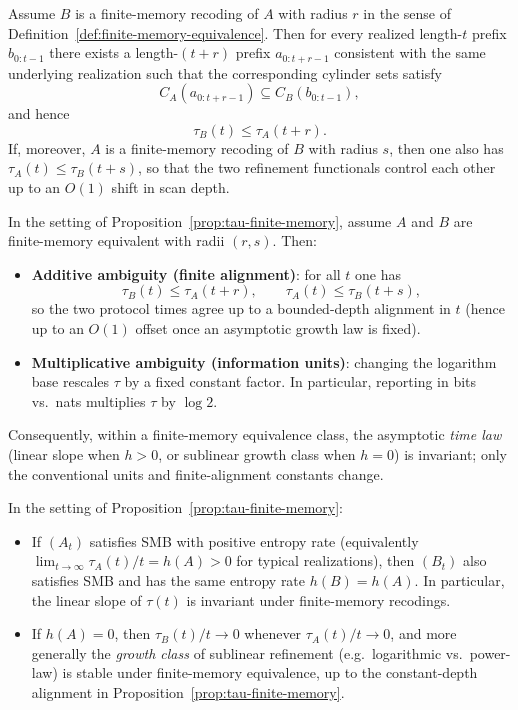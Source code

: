 \begin{proposition}\label{prop:tau-finite-memory}
Assume $B$ is a finite-memory recoding of $A$ with radius $r$ in the sense of Definition~\ref{def:finite-memory-equivalence}. Then for every realized length-$t$ prefix $b_{0:t-1}$ there exists a length-$(t+r)$ prefix $a_{0:t+r-1}$ consistent with the same underlying realization such that the corresponding cylinder sets satisfy
\[
C_A(a_{0:t+r-1})\subseteq C_B(b_{0:t-1}),
\]
and hence
\[
\tau_B(t)\le \tau_A(t+r).
\]
If, moreover, $A$ is a finite-memory recoding of $B$ with radius $s$, then one also has $\tau_A(t)\le \tau_B(t+s)$, so that the two refinement functionals control each other up to an $O(1)$ shift in scan depth.
\end{proposition}

\begin{corollary}\label{cor:tau-affine-class}
In the setting of Proposition~\ref{prop:tau-finite-memory}, assume $A$ and $B$ are finite-memory equivalent with radii $(r,s)$. Then:
\begin{itemize}[leftmargin=*,itemsep=2pt]
  \item \textbf{Additive ambiguity (finite alignment)}: for all $t$ one has
  \[
  \tau_B(t)\le \tau_A(t+r),\qquad \tau_A(t)\le \tau_B(t+s),
  \]
  so the two protocol times agree up to a bounded-depth alignment in $t$ (hence up to an $O(1)$ offset once an asymptotic growth law is fixed).
  \item \textbf{Multiplicative ambiguity (information units)}: changing the logarithm base rescales $\tau$ by a fixed constant factor. In particular, reporting in bits vs.\ nats multiplies $\tau$ by $\log 2$.
\end{itemize}
Consequently, within a finite-memory equivalence class, the asymptotic \emph{time law} (linear slope when $h>0$, or sublinear growth class when $h=0$) is invariant; only the conventional units and finite-alignment constants change.
\end{corollary}

\begin{corollary}\label{cor:tau-class-invariance}
In the setting of Proposition~\ref{prop:tau-finite-memory}:
\begin{itemize}[leftmargin=*,itemsep=2pt]
  \item If $(A_t)$ satisfies SMB with positive entropy rate (equivalently $\lim_{t\to\infty}\tau_A(t)/t=h(A)>0$ for typical realizations), then $(B_t)$ also satisfies SMB and has the same entropy rate $h(B)=h(A)$. In particular, the linear slope of $\tau(t)$ is invariant under finite-memory recodings.
  \item If $h(A)=0$, then $\tau_B(t)/t\to 0$ whenever $\tau_A(t)/t\to 0$, and more generally the \emph{growth class} of sublinear refinement (e.g.\ logarithmic vs.\ power-law) is stable under finite-memory equivalence, up to the constant-depth alignment in Proposition~\ref{prop:tau-finite-memory}.
\end{itemize}
\end{corollary}

